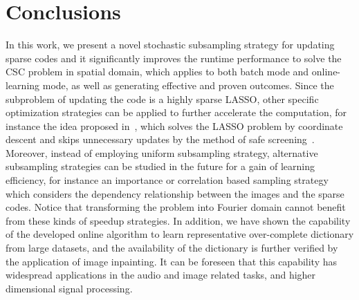 \section{Conclusions}
In this work, we present a novel stochastic subsampling strategy for updating sparse codes and it significantly improves the runtime performance to solve the CSC problem in spatial domain, which applies to both batch mode and online-learning mode, as well as generating effective and proven outcomes. Since the subproblem of updating the code is a highly sparse LASSO, other specific optimization strategies can be applied to further accelerate the computation, for instance the idea proposed in~\cite{johnson2017stingycd}, which solves the LASSO problem by coordinate descent and skips unnecessary updates by the method of safe screening~\cite{ghaoui2012Swfe}. Moreover, instead of employing uniform subsampling strategy, alternative subsampling strategies can be studied in the future for a gain of learning efficiency, for instance an importance or correlation based sampling strategy which considers the dependency relationship between the images and the sparse codes. Notice that transforming the problem into Fourier domain cannot benefit from these kinds of speedup strategies. In addition, we have shown the capability of the developed online algorithm to learn representative over-complete dictionary from large datasets, and the availability of the dictionary is further verified by the application of image inpainting. It can be foreseen that this capability has widespread applications in the audio and image related tasks, and higher dimensional signal processing.